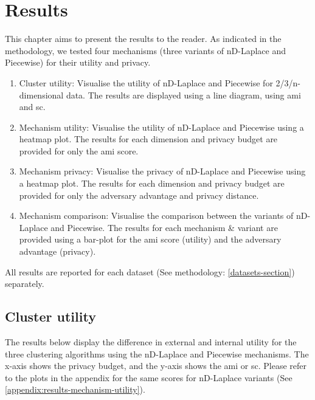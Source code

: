 \chapter{Results}
This chapter aims to present the results to the reader.
As indicated in the methodology, we tested four mechanisms (three variants of nD-Laplace and Piecewise) for their utility and privacy.
\begin{enumerate}
  \item Cluster utility: Visualise the utility of nD-Laplace and Piecewise for 2/3/n-dimensional data.
        The results are displayed using a line diagram, using \gls{ami} and \gls{sc}.
  \item Mechanism utility: Visualise the utility of nD-Laplace and Piecewise using a heatmap plot.
        The results for each dimension and privacy budget are provided for only the \gls{ami} score.
  \item Mechanism privacy: Visualise the privacy of nD-Laplace and Piecewise using a heatmap plot.
        The results for each dimension and privacy budget are provided for only the adversary advantage and privacy distance.
  \item Mechanism comparison: Visualise the comparison between the variants of nD-Laplace and Piecewise.
        The results for each mechanism \& variant are provided using a bar-plot for the \gls{ami} score (utility) and the adversary advantage (privacy).
\end{enumerate}
All results are reported for each dataset (See methodology: \ref{datasets-section}) separately.
\section{Cluster utility}
The results below display the difference in external and internal utility for the three clustering algorithms using the nD-Laplace and Piecewise mechanisms.
The x-axis shows the privacy budget, and the y-axis shows the \gls{ami} or \gls{sc}.
Please refer to the plots in the appendix for the same scores for nD-Laplace variants (See \ref{appendix:results-mechanism-utility}).
\newpage

